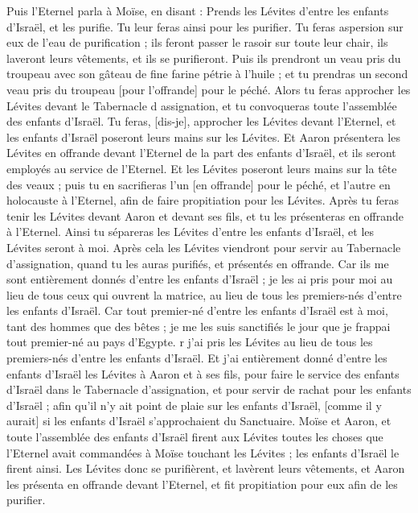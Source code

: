 \begin{multicols}{2}
Puis l'Eternel parla à Moïse, en disant :
Prends les Lévites d'entre les enfants d'Israël, et les purifie.
Tu leur feras ainsi pour les purifier. Tu feras aspersion sur eux de l'eau de purification ; ils feront passer le rasoir sur toute leur chair, ils laveront leurs vêtements, et ils se purifieront.
Puis ils prendront un veau pris du troupeau avec son gâteau de fine farine pétrie à l'huile ; et tu prendras un second veau pris du troupeau [pour l'offrande] pour le péché.
Alors tu feras approcher les Lévites devant le Tabernacle d assignation, et tu convoqueras toute l'assemblée des enfants d'Israël.
Tu feras, [dis-je], approcher les Lévites devant l'Eternel, et les enfants d'Israël poseront leurs mains sur les Lévites.
Et Aaron présentera les Lévites en offrande devant l'Eternel de la part des enfants d'Israël, et ils seront employés au service de l'Eternel.
Et les Lévites poseront leurs mains sur la tête des veaux ; puis tu en sacrifieras l'un [en offrande] pour le péché, et l'autre en holocauste à l'Eternel, afin de faire propitiation pour les Lévites.
Après tu feras tenir les Lévites devant Aaron et devant ses fils, et tu les présenteras en offrande à l'Eternel.
Ainsi tu sépareras les Lévites d'entre les enfants d'Israël, et les Lévites seront à moi.
Après cela les Lévites viendront pour servir au Tabernacle d'assignation, quand tu les auras purifiés, et présentés en offrande.
Car ils me sont entièrement donnés d'entre les enfants d'Israël ; je les ai pris pour moi au lieu de tous ceux qui ouvrent la matrice, au lieu de tous les premiers-nés d'entre les enfants d'Israël.
Car tout premier-né d'entre les enfants d'Israël est à moi, tant des hommes que des bêtes ; je me les suis sanctifiés le jour que je frappai tout premier-né au pays d'Egypte.
r j'ai pris les Lévites au lieu de tous les premiers-nés d'entre les enfants d'Israël.
Et j'ai entièrement donné d'entre les enfants d'Israël les Lévites à Aaron et à ses fils, pour faire le service des enfants d'Israël dans le Tabernacle d'assignation, et pour servir de rachat pour les enfants d'Israël ; afin qu'il n'y ait point de plaie sur les enfants d'Israël, [comme il y aurait] si les enfants d'Israël s'approchaient du Sanctuaire.
Moïse et Aaron, et toute l'assemblée des enfants d'Israël firent aux Lévites toutes les choses que l'Eternel avait commandées à Moïse touchant les Lévites ; les enfants d'Israël le firent ainsi.
Les Lévites donc se purifièrent, et lavèrent leurs vêtements, et Aaron les présenta en offrande devant l'Eternel, et fit propitiation pour eux afin de les purifier.

\end{multicols}
